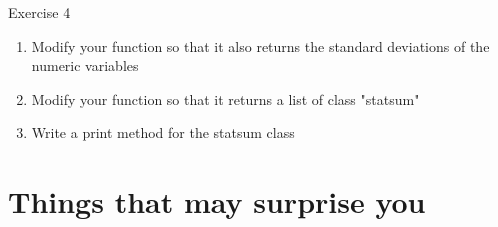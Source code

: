\documentclass[table,smaller]{beamer}
\begin{document}
\begin{frame}[label=sec-7-7]{Exercise 4}
\begin{enumerate}
\item Modify your function so that it also returns the standard deviations of the numeric variables

\item Modify your function so that it returns a list of class "statsum"

\item Write a print method for the statsum class
\end{enumerate}
\end{frame}

\section{Things that may surprise you}
\label{sec-8}
\end{document}
